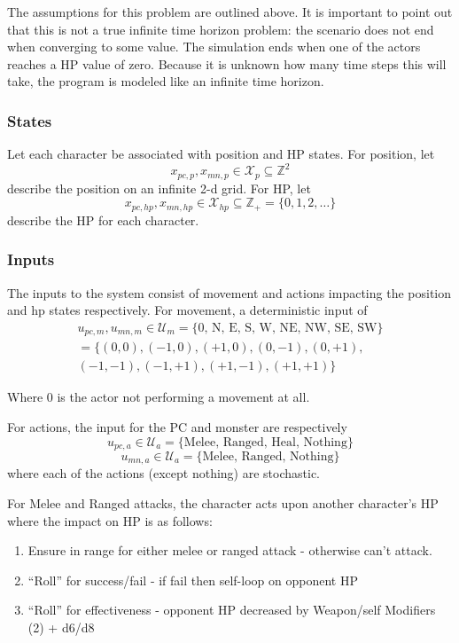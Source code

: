 \documentclass[letterpaper, 10 pt, conference]{ieeeconf}
\newcommand{\Z}{\mathbb{Z}}
\begin{document}
The assumptions for this problem are outlined above. It is important to point out that this is not a true infinite time horizon problem: the scenario does not end when converging to
some value. The simulation ends when one of the actors reaches a HP value of zero. Because it is unknown how many time steps this will take, the program is modeled like an infinite time horizon.

\subsubsection{States}
Let each character be associated with position and HP states.
For position, let \[
    x_{pc,p}, x_{mn,p} \in \mathcal{X}_{p} \subseteq \Z^{2}
\] describe the position on an infinite 2-d grid.
For HP, let \[
    x_{pc,hp}, x_{mn,hp} \in \mathcal{X}_{hp} \subseteq \Z_+ = \{0, 1, 2, \dots\}
\] describe the HP for each character.

\subsubsection{Inputs}
The inputs to the system consist of movement and actions impacting the position and hp states respectively.
For movement, a deterministic input of 
\begin{multline}
    u_{pc,m}, u_{mn,m} \in \mathcal{U}_{m} = \text{\{0, N, E, S, W, NE, NW, SE, SW\}}\\
    =\{(0,0),(-1,0), (+1,0),(0,-1), (0,+1), \\ (-1,-1), (-1,+1), (+1,-1),(+1,+1)\}
\end{multline}

Where \(0\) is the actor not performing a movement at all.

For actions, the input for the PC and monster are respectively \[
    u_{pc,a} \in \mathcal{U}_{a} = \{\text{Melee, Ranged, Heal, Nothing}\}\]
    \[u_{mn,a} \in \mathcal{U}_{a} = \{\text{Melee, Ranged, Nothing}\}
\] where each of the actions (except nothing) are stochastic.

For Melee and Ranged attacks, the character acts upon another character's HP where the impact on HP is as follows:
\begin{enumerate}
    \item Ensure in range for either melee or ranged attack - otherwise can't attack.
    \item ``Roll'' for success/fail - if fail then self-loop on opponent HP
    \item ``Roll'' for effectiveness - opponent HP decreased by Weapon/self Modifiers (2) + d6/d8
\end{enumerate}
\end{document}
